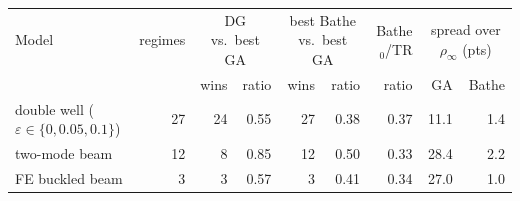 \begin{tabular}{lrrrrrrrr}\toprule
Model & regimes & \multicolumn{2}{c}{DG vs.\ best GA} & \multicolumn{2}{c}{best Bathe vs.\ best GA} & Bathe$_0$/TR & \multicolumn{2}{c}{spread over $\rho_\infty$ (pts)} \\
 & & wins & ratio & wins & ratio & ratio & GA & Bathe \\\midrule
double well ($\varepsilon\in\{0,0.05,0.1\}$) & 27 & 24 & 0.55 & 27 & 0.38 & 0.37 & 11.1 & 1.4 \\
two-mode beam & 12 & 8 & 0.85 & 12 & 0.50 & 0.33 & 28.4 & 2.2 \\
FE buckled beam & 3 & 3 & 0.57 & 3 & 0.41 & 0.34 & 27.0 & 1.0 \\
\bottomrule\end{tabular}
